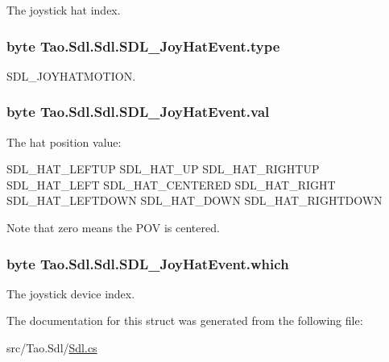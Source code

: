 The joystick hat index. 

\hypertarget{struct_tao_1_1_sdl_1_1_sdl_1_1_s_d_l___joy_hat_event_a504a458cdb6163c0fd06bdf0f5adc330}{
\subsubsection[{type}]{\setlength{\rightskip}{0pt plus 5cm}byte {\bf Tao.Sdl.Sdl.SDL\_\-JoyHatEvent.type}}}
\label{struct_tao_1_1_sdl_1_1_sdl_1_1_s_d_l___joy_hat_event_a504a458cdb6163c0fd06bdf0f5adc330}


SDL\_\-JOYHATMOTION. 

\hypertarget{struct_tao_1_1_sdl_1_1_sdl_1_1_s_d_l___joy_hat_event_a0a000070dcc327197403faeaf76bbe87}{
\subsubsection[{val}]{\setlength{\rightskip}{0pt plus 5cm}byte {\bf Tao.Sdl.Sdl.SDL\_\-JoyHatEvent.val}}}
\label{struct_tao_1_1_sdl_1_1_sdl_1_1_s_d_l___joy_hat_event_a0a000070dcc327197403faeaf76bbe87}


The hat position value: 


\begin{DoxyCode}
SDL_HAT_LEFTUP   SDL_HAT_UP       SDL_HAT_RIGHTUP
                 SDL_HAT_LEFT     SDL_HAT_CENTERED SDL_HAT_RIGHT
                 SDL_HAT_LEFTDOWN SDL_HAT_DOWN     SDL_HAT_RIGHTDOWN
\end{DoxyCode}
 Note that zero means the POV is centered. \hypertarget{struct_tao_1_1_sdl_1_1_sdl_1_1_s_d_l___joy_hat_event_a432ddbd1d5b39e4ab65e90414fb04aca}{
\subsubsection[{which}]{\setlength{\rightskip}{0pt plus 5cm}byte {\bf Tao.Sdl.Sdl.SDL\_\-JoyHatEvent.which}}}
\label{struct_tao_1_1_sdl_1_1_sdl_1_1_s_d_l___joy_hat_event_a432ddbd1d5b39e4ab65e90414fb04aca}


The joystick device index. 



The documentation for this struct was generated from the following file:\begin{DoxyCompactItemize}
\item 
src/Tao.Sdl/\hyperlink{_sdl_8cs}{Sdl.cs}\end{DoxyCompactItemize}
